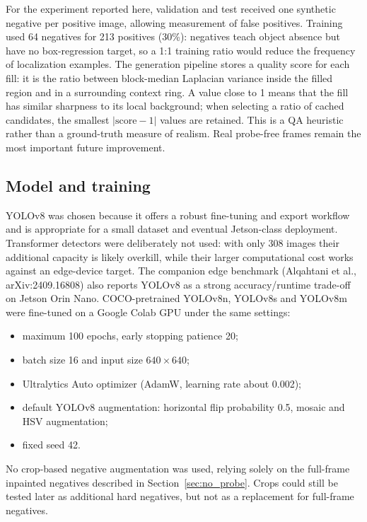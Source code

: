 \documentclass[11pt,a4paper]{article}
\begin{document}
For the experiment reported here, validation and test received one synthetic negative per positive image, allowing measurement of false positives. Training used 64 negatives for 213 positives (30\%): negatives teach object absence but have no box-regression target, so a 1:1 training ratio would reduce the frequency of localization examples. The generation pipeline stores a quality score for each fill: it is the ratio between block-median Laplacian variance inside the filled region and in a surrounding context ring. A value close to 1 means that the fill has similar sharpness to its local background; when selecting a ratio of cached candidates, the smallest $|\mathrm{score}-1|$ values are retained. This is a QA heuristic rather than a ground-truth measure of realism. Real probe-free frames remain the most important future improvement.

\subsection{Model and training}

YOLOv8 was chosen because it offers a robust fine-tuning and export workflow and is appropriate for a small dataset and eventual Jetson-class deployment. Transformer detectors were deliberately not used: with only 308 images their additional capacity is likely overkill, while their larger computational cost works against an edge-device target. The companion edge benchmark (Alqahtani et al., arXiv:2409.16808) also reports YOLOv8 as a strong accuracy/runtime trade-off on Jetson Orin Nano. COCO-pretrained YOLOv8n, YOLOv8s and YOLOv8m were fine-tuned on a Google Colab GPU under the same settings:

\begin{itemize}[nosep]
    \item maximum 100 epochs, early stopping patience 20;
    \item batch size 16 and input size $640\times640$;
    \item Ultralytics Auto optimizer (AdamW, learning rate about 0.002);
    \item default YOLOv8 augmentation: horizontal flip probability 0.5, mosaic and HSV augmentation;
    \item fixed seed 42.
\end{itemize}

No crop-based negative augmentation was used, relying solely on the full-frame inpainted negatives described in Section~\ref{sec:no_probe}. Crops could still be tested later as additional hard negatives, but not as a replacement for full-frame negatives.
\end{document}
